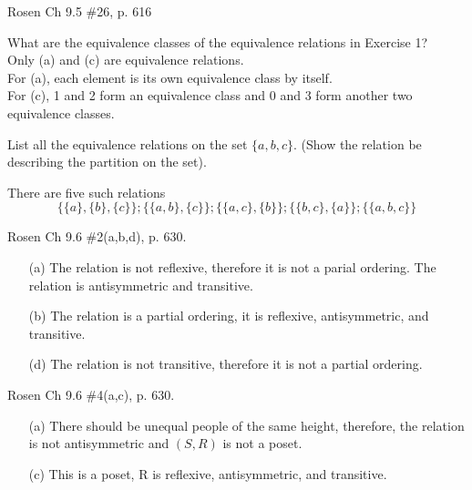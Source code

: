 \begin{questions}
 Rosen Ch 9.5 \#26, p. 616
    \ifprintanswers
        \vspace{-10pt}
    \fi
    \begin{solution}
    What are the equivalence classes of the equivalence relations in
    Exercise 1? \\
    Only (a) and (c) are equivalence relations. \\
    For (a), each element is its own equivalence class by itself.\\
    For (c), 1 and 2 form an equivalence class and 0 and 3 form
    another two equivalence classes.
    \end{solution}


 List all the equivalence relations on the set $\{a, b, c\}$.  (Show the relation be describing the partition on the set).
    \ifprintanswers
        \vspace{-10pt}
    \fi
    \begin{solution}
    There are five such relations
    \[ \{ \{a\}, \{b\}, \{c\} \}; \{ \{a, b\}, \{c\} \}; \{ \{a, c\}, \{b\} \}; 
        \{ \{b, c\}, \{a\} \};  \{ \{a, b, c\} \} \]
    \end{solution}


 Rosen Ch 9.6 \#2(a,b,d), p. 630.
    \ifprintanswers
        \vspace{-10pt}
    \fi
    \begin{solution}
    \begin{itemize}[itemsep=0pt,parsep=0pt,topsep=0pt,partopsep=0pt]
        \item[(a)] The relation is not reflexive, therefore it is not a parial ordering.  The relation is antisymmetric and transitive.
        \item[(b)] The relation is a partial ordering, it is reflexive, antisymmetric, and transitive.
        \item[(d)] The relation is not transitive, therefore it is not a partial ordering.
    \end{itemize}
    \end{solution}


 Rosen Ch 9.6 \#4(a,c), p. 630.
    \ifprintanswers
        \vspace{-10pt}
    \fi
    \begin{solution}
    \begin{itemize}[itemsep=0pt,parsep=0pt,topsep=0pt,partopsep=0pt]
        \item[(a)] There should be unequal people of the same height, therefore, the relation is not antisymmetric and $(S, R)$ is not a poset.
        \item[(c)] This is a poset, R is reflexive, antisymmetric, and transitive.
    \end{itemize}
    \end{solution}



\end{questions}
